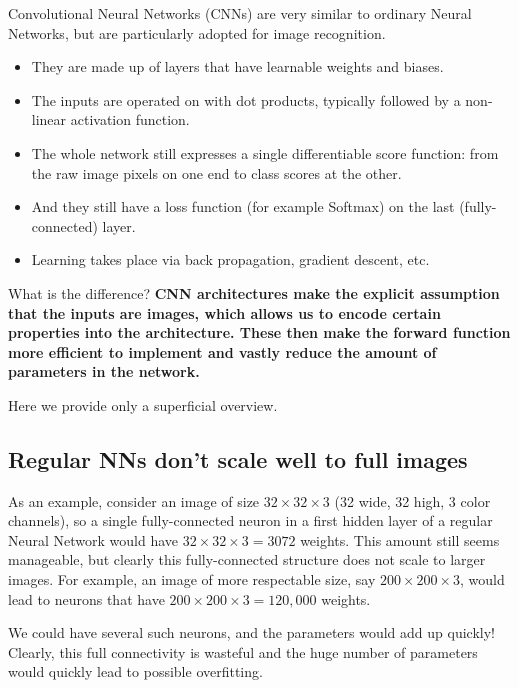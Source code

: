 \documentclass[%
oneside,                 %
final,                   %
10pt]{article}
\begin{document}
Convolutional Neural Networks (CNNs) are very similar to ordinary Neural Networks, but are particularly adopted for image recognition.

\begin{itemize}
\item They are made up of layers that have learnable weights and biases. 

\item The inputs are operated on with dot products, typically followed by a non-linear activation function. 

\item The whole network still expresses a single differentiable score function: from the raw image pixels on one end to class scores at the other. 

\item And they still have a loss function (for example Softmax) on the last (fully-connected) layer. 

\item Learning takes place via back propagation, gradient descent, etc.
\end{itemize}

\noindent
What is the difference? \textbf{CNN architectures make the explicit assumption that
the inputs are images, which allows us to encode certain properties
into the architecture. These then make the forward function more
efficient to implement and vastly reduce the amount of parameters in
the network.}

Here we provide only a superficial overview.

\subsection{Regular NNs don’t scale well to full images}

As an example, consider
an image of size $32\times 32\times 3$ (32 wide, 32 high, 3 color channels), so a
single fully-connected neuron in a first hidden layer of a regular
Neural Network would have $32\times 32\times 3 = 3072$ weights. This amount still
seems manageable, but clearly this fully-connected structure does not
scale to larger images. For example, an image of more respectable
size, say $200\times 200\times 3$, would lead to neurons that have 
$200\times 200\times 3 = 120,000$ weights. 

We could have several such neurons, and the parameters would add up quickly! Clearly,
this full connectivity is wasteful and the huge number of parameters
would quickly lead to possible overfitting.
\end{document}
